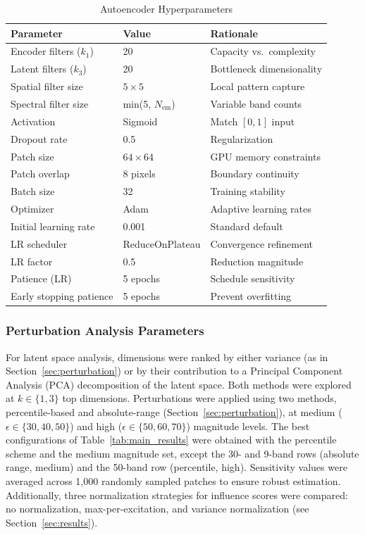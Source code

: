 \begin{table}[!t]
\centering
\caption{Autoencoder Hyperparameters}
\label{tab:hyperparams}
\begin{tabular}{@{}lll@{}}
\toprule
\textbf{Parameter} & \textbf{Value} & \textbf{Rationale} \\
\midrule
Encoder filters ($k_1$) & 20 & Capacity vs.~complexity \\
Latent filters ($k_3$) & 20 & Bottleneck dimensionality \\
Spatial filter size & $5 \times 5$ & Local pattern capture \\
Spectral filter size & min(5, $N_{\text{em}}$) & Variable band counts \\
Activation & Sigmoid & Match $[0,1]$ input \\
Dropout rate & 0.5 & Regularization \\
Patch size & $64 \times 64$ & GPU memory constraints \\
Patch overlap & 8 pixels & Boundary continuity \\
Batch size & 32 & Training stability \\
Optimizer & Adam~\cite{kingma2014adam} & Adaptive learning rates \\
Initial learning rate & 0.001 & Standard default \\
LR scheduler & ReduceOnPlateau & Convergence refinement \\
LR factor & 0.5 & Reduction magnitude \\
Patience (LR) & 5 epochs & Schedule sensitivity \\
Early stopping patience & 5 epochs & Prevent overfitting \\
\bottomrule
\end{tabular}
\end{table}

\subsubsection{Perturbation Analysis Parameters}
For latent space analysis, dimensions were ranked by either variance (as in Section~\ref{sec:perturbation}) or by their contribution to a Principal Component Analysis (PCA) decomposition of the latent space.
Both methods were explored at $k \in \{1, 3\}$ top dimensions. Perturbations were applied using two methods, percentile-based and absolute-range (Section~\ref{sec:perturbation}), at medium ($\epsilon \in \{30, 40, 50\}$) and high ($\epsilon \in \{50, 60, 70\}$) magnitude levels.
The best configurations of Table~\ref{tab:main_results} were obtained with the percentile scheme and the medium magnitude set, except the 30- and 9-band rows (absolute range, medium) and the 50-band row (percentile, high).
Sensitivity values were averaged across 1,000 randomly sampled patches to ensure robust estimation.
Additionally, three normalization strategies for influence scores were compared: no normalization, max-per-excitation, and variance normalization (see Section~\ref{sec:results}).


